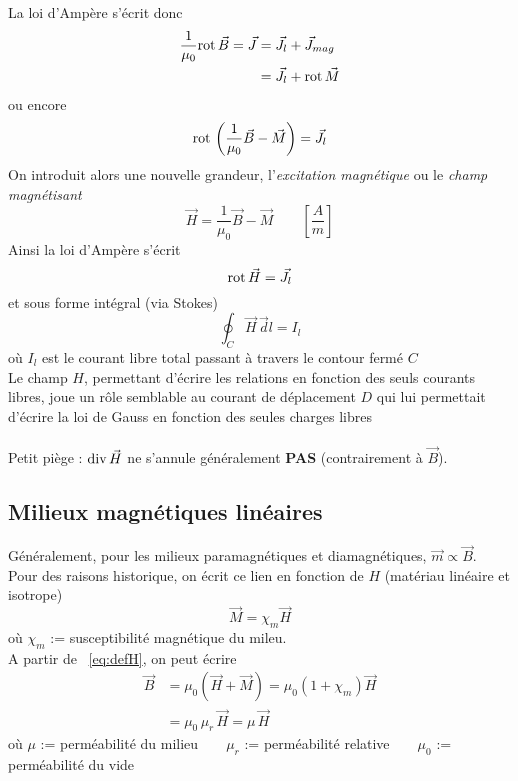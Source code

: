 \documentclass[british,french,11pt, a4paper, openany]{book}
\begin{document}
		La loi d'Ampère s'écrit donc 
		\begin{align}
		\frac{1}{\mu_0}\text{rot}\,\vec B=\vec J & =\vec J_{l}+\vec J_{mag} \\
		& =\vec J_{l}+\text{rot}\,\vec M   
		\end{align}
		ou encore 
		\begin{equation}
		\text{rot}\,\left(\frac{1}{\mu_0}\vec B-\vec M\right)=\vec J_{l}
		\end{equation}
		On introduit alors une nouvelle grandeur, l'\textit{excitation magnétique} ou le \textit{champ magnétisant}
		\begin{equation}\label{eq:defH}
		\vec H=\frac{1}{\mu_0}\vec B-\vec M\qquad \left[\frac{A}{m}\right]
		\end{equation}
		Ainsi la loi d'Ampère s'écrit
		\begin{equation}
		\text{rot}\,\vec H=\vec J_{l}
		\end{equation}
		et sous forme intégral (via Stokes)
		\begin{equation}\label{eq:ampereH}
		\oint_C\vec H\,\vec dl=I_{l}
		\end{equation}
		où $I_{l}$ est le courant libre total passant à travers le contour fermé $C$\\
		
		Le champ $H$, permettant d'écrire les relations en fonction des seuls courants libres, joue un rôle semblable au courant de déplacement $D$ qui lui permettait d'écrire la loi de Gauss en fonction des seules charges libres\\\\
		\danger Petit piège :  $\text{div}\, \vec{H}$ ne s'annule généralement \textbf{PAS} (contrairement à $\vec{B}$).
		\subsection{Milieux magnétiques linéaires}
		Généralement, pour les milieux paramagnétiques et diamagnétiques,  $\vec m \propto\vec B$.\ \\
		Pour des raisons historique, on écrit ce lien en fonction de $H$ (matériau linéaire et isotrope)
		\begin{equation}
		\vec M=\chi_m\vec H
		\end{equation}
		où $\chi_m$ := susceptibilité magnétique du mileu.\\
		
		A partir de ~\eqref{eq:defH}, on peut écrire
		\begin{align}
		\vec B & =\mu_0\left(\vec H+\vec M\right)=\mu_0(1+\chi_m)\vec H \\
		& =\mu_0\,\mu_r\,\vec H=\mu\,\vec H                      
		\end{align}
		où $\mu$ := perméabilité du milieu$\qquad\mu_r$ := perméabilité relative$\qquad\mu_0$ := perméabilité du vide\\
		
\end{document}
